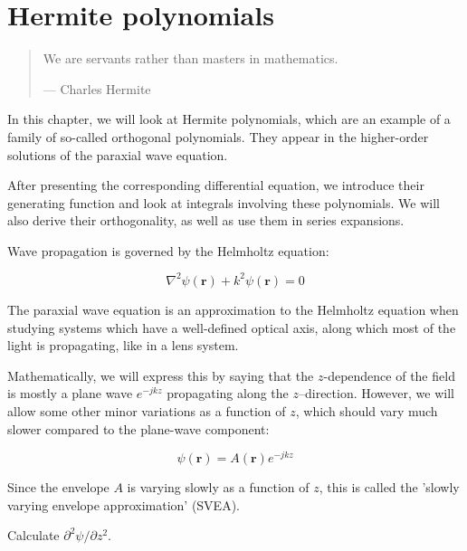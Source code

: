 \chapter{Hermite polynomials}
\label{h:hermite}

\begin{quote}
We are servants rather than masters in mathematics.

--- Charles Hermite
\end{quote}

\chaptertoc

In this chapter, we will look at Hermite polynomials, which are an example of a family of so-called orthogonal polynomials. They appear in the higher-order solutions of the paraxial wave equation.

After presenting the corresponding differential equation, we introduce their generating function and look at integrals involving these polynomials. We will also derive their orthogonality, as well as use them in series expansions.

\pagebreak


Wave propagation is governed by the Helmholtz equation:

\begin{equation}
\nabla^2 \psi({\mathbf r}) + k^2 \psi({\mathbf r}) = 0
\end{equation}

The paraxial wave equation is an approximation to the Helmholtz equation when studying systems which have a well-defined optical axis, along which most of the light is propagating, like in a lens system.

Mathematically, we will express this by saying that the $z$-dependence of the field is mostly a plane wave $e^{-jkz}$ propagating along the $z$--direction. However, we will allow some other minor variations as a function of $z$, which should vary much slower compared to the plane-wave component:

\begin{equation}
\psi({\mathbf r}) = A({\mathbf r})e^{-jkz}
\label{eq-svea-ansatz}
\end{equation}

Since the envelope $A$ is varying slowly as a function of $z$, this is called the 'slowly varying envelope approximation' (SVEA).

\begin{cue}
Calculate $\partial^2 \psi / \partial z^2$.
\end{cue}

